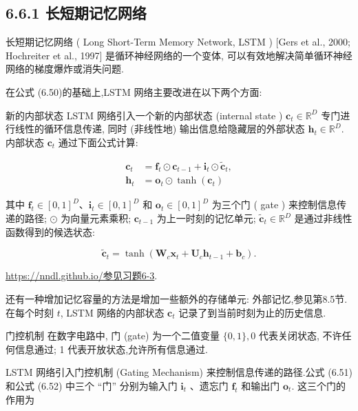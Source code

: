 \documentclass[10pt]{article}
\begin{document}
\subsection*{6.6.1 长短期记忆网络}
长短期记忆网络 ( Long Short-Term Memory Network, LSTM ) [Gers et al., 2000; Hochreiter et al., 1997] 是循环神经网络的一个变体, 可以有效地解决简单循环神经网络的梯度爆炸或消失问题.

在公式 (6.50)的基础上,LSTM 网络主要改进在以下两个方面:

新的内部状态 LSTM 网络引入一个新的内部状态 (internal state ) $\boldsymbol{c}_{t} \in \mathbb{R}^{D}$ 专门进行线性的循环信息传递, 同时 (非线性地) 输出信息给隐藏层的外部状态 $\boldsymbol{h}_{t} \in \mathbb{R}^{D}$. 内部状态 $\boldsymbol{c}_{t}$ 通过下面公式计算:


\begin{align*}
\boldsymbol{c}_{t} & =\boldsymbol{f}_{t} \odot \boldsymbol{c}_{t-1}+\boldsymbol{i}_{t} \odot \tilde{\boldsymbol{c}}_{t},  \tag{6.51}\\
\boldsymbol{h}_{t} & =\boldsymbol{o}_{t} \odot \tanh \left(\boldsymbol{c}_{t}\right) \tag{6.52}
\end{align*}


其中 $\boldsymbol{f}_{t} \in[0,1]^{D} 、 \boldsymbol{i}_{t} \in[0,1]^{D}$ 和 $\boldsymbol{o}_{t} \in[0,1]^{D}$ 为三个门 ( gate ) 来控制信息传递的路径; $\odot$ 为向量元素乘积; $\boldsymbol{c}_{t-1}$ 为上一时刻的记忆单元; $\tilde{\boldsymbol{c}}_{t} \in \mathbb{R}^{D}$ 是通过非线性函数得到的候选状态:


\begin{equation*}
\tilde{\boldsymbol{c}}_{t}=\tanh \left(\boldsymbol{W}_{c} \boldsymbol{x}_{t}+\boldsymbol{U}_{c} \boldsymbol{h}_{t-1}+\boldsymbol{b}_{c}\right) . \tag{6.53}
\end{equation*}


\href{https://nndl.github.io/%E5%8F%82%E8%A7%81%E4%B9%A0%E9%A2%986-3}{https://nndl.github.io/参见习题6-3}.

还有一种增加记忆容量的方法是增加一些额外的存储单元: 外部记忆,参见第8.5节.\\
在每个时刻 $t$, LSTM 网络的内部状态 $\boldsymbol{c}_{t}$ 记录了到当前时刻为止的历史信息.

门控机制 在数字电路中, 门 (gate) 为一个二值变量 $\{0,1\}, 0$ 代表关闭状态, 不许任何信息通过; 1 代表开放状态,允许所有信息通过.

LSTM 网络引入门控机制 (Gating Mechanism) 来控制信息传递的路径.公式 (6.51) 和公式 (6.52) 中三个 “门” 分别为输入门 $\boldsymbol{i}_{t}$ 、遗忘门 $\boldsymbol{f}_{t}$ 和输出门 $\boldsymbol{o}_{t}$. 这三个门的作用为
\end{document}
